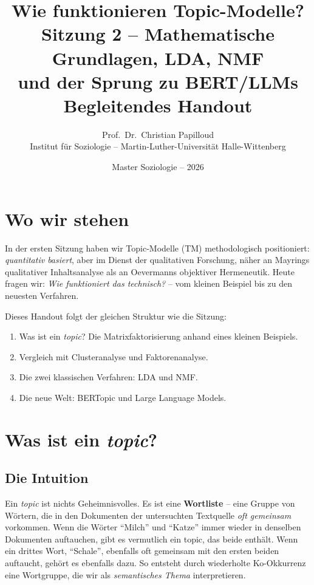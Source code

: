 \documentclass[a4paper,11pt]{article}
\title{\textbf{Wie funktionieren Topic-Modelle?}\\[4pt]
\large Sitzung 2 -- Mathematische Grundlagen, LDA, NMF\\
und der Sprung zu BERT/LLMs\\[8pt]
\normalsize Begleitendes Handout}
\author{Prof.\ Dr.\ Christian Papilloud\\
\small Institut für Soziologie -- Martin-Luther-Universität Halle-Wittenberg}
\date{Master Soziologie -- 2026}
\begin{document}
\maketitle
\thispagestyle{fancy}

\vspace{-1em}

\section{Wo wir stehen}

In der ersten Sitzung haben wir Topic-Modelle (TM) methodologisch
positioniert: \emph{quantitativ basiert}, aber im Dienst der
qualitativen Forschung, näher an Mayrings qualitativer Inhaltsanalyse
als an Oevermanns objektiver Hermeneutik. Heute fragen wir: \emph{Wie
funktioniert das technisch?} -- vom kleinen Beispiel bis zu den
neuesten Verfahren.

Dieses Handout folgt der gleichen Struktur wie die Sitzung:

\begin{enumerate}
\item Was ist ein \emph{topic}? Die Matrixfaktorisierung anhand eines
kleinen Beispiels.
\item Vergleich mit Clusteranalyse und Faktorenanalyse.
\item Die zwei klassischen Verfahren: LDA und NMF.
\item Die neue Welt: BERTopic und Large Language Models.
\end{enumerate}

\section{Was ist ein \emph{topic}?}

\subsection{Die Intuition}

Ein \emph{topic} ist nichts Geheimnisvolles. Es ist eine
\textbf{Wortliste} -- eine Gruppe von Wörtern, die in den
Dokumenten der untersuchten Textquelle \emph{oft gemeinsam}
vorkommen. Wenn die Wörter \enquote{Milch} und \enquote{Katze}
immer wieder in denselben Dokumenten auftauchen, gibt es vermutlich
ein topic, das beide enthält. Wenn ein drittes Wort, \enquote{Schale},
ebenfalls oft gemeinsam mit den ersten beiden auftaucht, gehört es
ebenfalls dazu. So entsteht durch wiederholte Ko-Okkurrenz eine
Wortgruppe, die wir als \emph{semantisches Thema} interpretieren.
\end{document}
